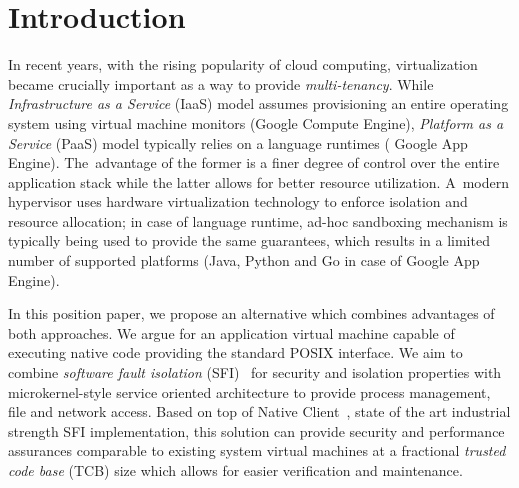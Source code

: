 \section{Introduction}
\label{sec:intro}


In recent years, with the rising popularity of cloud computing,
virtualization became crucially important as a way to provide
\emph{multi-tenancy}. While \emph{Infrastructure as a Service} (IaaS)
model assumes provisioning an entire operating system using virtual
machine monitors (\eg Google Compute Engine), \emph{Platform as a
Service} (PaaS) model typically relies on a language runtimes (\eg
Google App Engine). The~advantage of the former is a finer degree of
control over the entire application stack while the latter allows for
better resource utilization. A~modern hypervisor uses hardware
virtualization technology to enforce isolation and resource allocation;
in case of language runtime, ad-hoc sandboxing mechanism is typically
being used to provide the same guarantees, which results in a limited
number of supported platforms (\eg Java, Python and Go in case of Google
App Engine).



In this position paper, we propose an alternative which combines
advantages of both approaches. We argue for an application virtual
machine capable of executing native code providing the standard POSIX
interface. We aim to combine \emph{software fault isolation}
(SFI)~\cite{wahbe:sosp93} for security and isolation properties with
microkernel-style service oriented architecture to provide process
management, file and network access. Based on top of Native
Client~\cite{yee:ieee-sp09}, state of the art industrial strength SFI
implementation, this solution can provide security and performance
assurances comparable to existing system virtual machines at a
fractional \emph{trusted code base} (TCB) size which allows for easier
verification and maintenance. 

